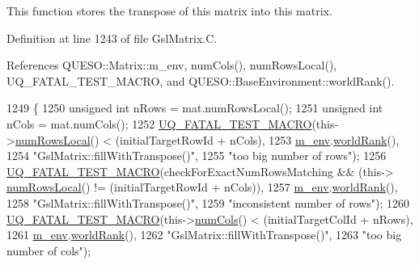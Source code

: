 This function stores the transpose of {\ttfamily this} matrix into {\ttfamily this} matrix. 



Definition at line 1243 of file Gsl\-Matrix.\-C.



References Q\-U\-E\-S\-O\-::\-Matrix\-::m\-\_\-env, num\-Cols(), num\-Rows\-Local(), U\-Q\-\_\-\-F\-A\-T\-A\-L\-\_\-\-T\-E\-S\-T\-\_\-\-M\-A\-C\-R\-O, and Q\-U\-E\-S\-O\-::\-Base\-Environment\-::world\-Rank().


\begin{DoxyCode}
1249 \{
1250   \textcolor{keywordtype}{unsigned} \textcolor{keywordtype}{int} nRows = mat.numRowsLocal();
1251   \textcolor{keywordtype}{unsigned} \textcolor{keywordtype}{int} nCols = mat.numCols();
1252   \hyperlink{_defines_8h_a56d63d18d0a6d45757de47fcc06f574d}{UQ\_FATAL\_TEST\_MACRO}(this->\hyperlink{class_q_u_e_s_o_1_1_gsl_matrix_ab5ec937a9fd439eef1a87e12c0dbccb4}{numRowsLocal}() < (initialTargetRowId + nCols),
1253                       \hyperlink{class_q_u_e_s_o_1_1_matrix_a247fb0fc0b87fecdee054bb4660b68e8}{m\_env}.\hyperlink{class_q_u_e_s_o_1_1_base_environment_a78b57112bbd0e6dd0e8afec00b40ffa7}{worldRank}(),
1254                       \textcolor{stringliteral}{"GslMatrix::fillWithTranspose()"},
1255                       \textcolor{stringliteral}{"too big number of rows"});
1256   \hyperlink{_defines_8h_a56d63d18d0a6d45757de47fcc06f574d}{UQ\_FATAL\_TEST\_MACRO}(checkForExactNumRowsMatching && (this->
      \hyperlink{class_q_u_e_s_o_1_1_gsl_matrix_ab5ec937a9fd439eef1a87e12c0dbccb4}{numRowsLocal}() != (initialTargetRowId + nCols)),
1257                       \hyperlink{class_q_u_e_s_o_1_1_matrix_a247fb0fc0b87fecdee054bb4660b68e8}{m\_env}.\hyperlink{class_q_u_e_s_o_1_1_base_environment_a78b57112bbd0e6dd0e8afec00b40ffa7}{worldRank}(),
1258                       \textcolor{stringliteral}{"GslMatrix::fillWithTranspose()"},
1259                       \textcolor{stringliteral}{"inconsistent number of rows"});
1260   \hyperlink{_defines_8h_a56d63d18d0a6d45757de47fcc06f574d}{UQ\_FATAL\_TEST\_MACRO}(this->\hyperlink{class_q_u_e_s_o_1_1_gsl_matrix_ad5005f168fe030468e834776afb1859b}{numCols}() < (initialTargetColId + nRows),
1261                       \hyperlink{class_q_u_e_s_o_1_1_matrix_a247fb0fc0b87fecdee054bb4660b68e8}{m\_env}.\hyperlink{class_q_u_e_s_o_1_1_base_environment_a78b57112bbd0e6dd0e8afec00b40ffa7}{worldRank}(),
1262                       \textcolor{stringliteral}{"GslMatrix::fillWithTranspose()"},
1263                       \textcolor{stringliteral}{"too big number of cols"});

\end{DoxyCode}

